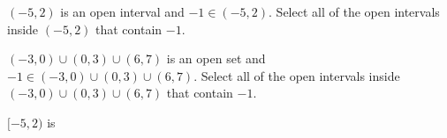 \documentclass{ximera}
\author{Lee Wayand}
\begin{document}
\begin{exercise}







\begin{question}
$(-5, 2)$ is an open interval and $-1 \in (-5, 2)$.  Select all of the open intervals inside $(-5, 2)$ that contain $-1$.
  \begin{selectAll}
  \end{selectAll}
\end{question}
















\begin{question}
$(-3, 0) \cup (0, 3) \cup (6, 7)$ is an open set and $-1 \in (-3, 0) \cup (0, 3) \cup (6, 7)$.  Select all of the open intervals inside $(-3, 0) \cup (0, 3) \cup (6, 7)$ that contain $-1$.
  \begin{selectAll}
  \end{selectAll}
\end{question}









\begin{question}
$[-5, 2)$ is 
  \begin{selectAll}
  \end{selectAll}
\end{question}





























\end{exercise}
\end{document}
